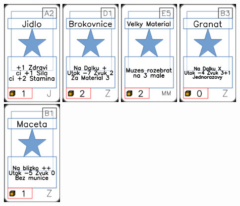 \documentclass[a4paper]{article}
\begin{document}
	\includegraphics[width=3.0cm]{img-1_1}
	\includegraphics[width=3.0cm]{img-1_105}
	\includegraphics[width=3.0cm]{img-1_54}
	\includegraphics[width=3.0cm]{img-1_97}
	\includegraphics[width=3.0cm]{img-1_95}
\end{document}
